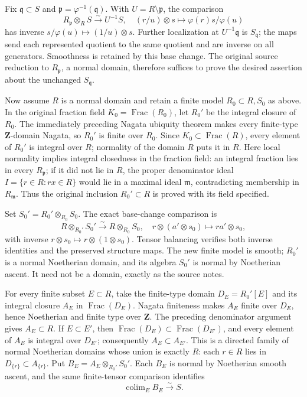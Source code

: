 Fix \(\mathfrak q\subset S\) and \(\mathfrak p=\varphi^{-1}(\mathfrak q)\). With \(U=R\setminus\mathfrak p\), the comparison \[
 R_{\mathfrak p}\otimes_RS\xrightarrow{\sim}U^{-1}S,
 \quad (r/u)\otimes s\longmapsto\varphi(r)s/\varphi(u)
\] has inverse \(s/\varphi(u)\mapsto (1/u)\otimes s\). Further localization at \(U^{-1}\mathfrak q\) is \(S_{\mathfrak q}\); the maps send each represented quotient to the same quotient and are inverse on all generators. Smoothness is retained by this base change. The original source reduction to \(R_{\mathfrak p}\), a normal domain, therefore suffices to prove the desired assertion about the unchanged \(S_{\mathfrak q}\).

Now assume \(R\) is a normal domain and retain a finite model \(R_0\subset R,S_0\) as above. In the original fraction field \(K_0=\operatorname{Frac}(R_0)\), let \(R_0'\) be the integral closure of \(R_0\). The immediately preceding Nagata ubiquity theorem makes every finite-type \(\mathbf Z\)-domain Nagata, so \(R_0'\) is finite over \(R_0\). Since \(K_0\subset\operatorname{Frac}(R)\), every element of \(R_0'\) is integral over \(R\); normality of the domain \(R\) puts it in \(R\). Here local normality implies integral closedness in the fraction field: an integral fraction lies in every \(R_{\mathfrak p}\); if it did not lie in \(R\), the proper denominator ideal \(I=\{r\in R:rx\in R\}\) would lie in a maximal ideal \(\mathfrak m\), contradicting membership in \(R_{\mathfrak m}\). Thus the original inclusion \(R_0'\subset R\) is proved with its field specified.

Set \(S_0'=R_0'\otimes_{R_0}S_0\). The exact base-change comparison is \[
 R\otimes_{R_0'}S_0'\xrightarrow{\sim}R\otimes_{R_0}S_0,
 \quad r\otimes(a'\otimes s_0)\longmapsto ra'\otimes s_0,
\] with inverse \(r\otimes s_0\mapsto r\otimes(1\otimes s_0)\). Tensor balancing verifies both inverse identities and the preserved structure maps. The new finite model is smooth; \(R_0'\) is a normal Noetherian domain, and its algebra \(S_0'\) is normal by Noetherian ascent. It need not be a domain, exactly as the source notes.

For every finite subset \(E\subset R\), take the finite-type domain \(D_E=R_0'[E]\) and its integral closure \(A_E\) in \(\operatorname{Frac}(D_E)\). Nagata finiteness makes \(A_E\) finite over \(D_E\), hence Noetherian and finite type over \(\mathbf Z\). The preceding denominator argument gives \(A_E\subset R\). If \(E\subset E'\), then \(\operatorname{Frac}(D_E)\subset\operatorname{Frac}(D_{E'})\), and every element of \(A_E\) is integral over \(D_{E'}\); consequently \(A_E\subset A_{E'}\). This is a directed family of normal Noetherian domains whose union is exactly \(R\): each \(r\in R\) lies in \(D_{\{r\}}\subset A_{\{r\}}\). Put \(B_E=A_E\otimes_{R_0'}S_0'\). Each \(B_E\) is normal by Noetherian smooth ascent, and the same finite-tensor comparison identifies \[
 \operatorname{colim}_E B_E\xrightarrow{\sim}S.
\]

